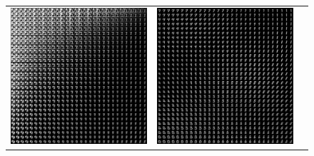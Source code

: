 \documentclass{article}
\begin{document}
\begin{figure}
  \centering
  \begin{tabularx}{\linewidth}{XXX}
    \includegraphics[width=\linewidth]{assignment_3/code/figures/vae_manifold_0.png} &
    \includegraphics[width=\linewidth]{assignment_3/code/figures/vae_manifold_20.png} &

\end{tabularx}
\end{figure}
\end{document}
